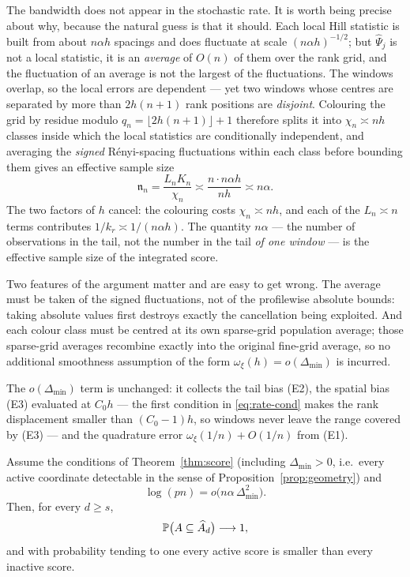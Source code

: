 The bandwidth does not appear in the stochastic rate. It is worth being
precise about why, because the natural guess is that it should. Each
local Hill statistic is built from about $n\alpha h$ spacings and does
fluctuate at scale $(n\alpha h)^{-1/2}$; but $\widehat\Psi_j$ is not a
local statistic, it is an \emph{average} of $O(n)$ of them over the rank
grid, and the fluctuation of an average is not the largest of the
fluctuations. The windows overlap, so the local errors are dependent ---
yet two windows whose centres are separated by more than $2h(n+1)$ rank
positions are \emph{disjoint}. Colouring the grid by residue modulo
$q_n=\lfloor2h(n+1)\rfloor+1$ therefore splits it into $\chi_n\asymp nh$
classes inside which the local statistics are conditionally independent,
and averaging the \emph{signed} R\'enyi-spacing fluctuations within each
class before bounding them gives an effective sample size
\[
 \mathfrak n_n=\frac{L_nK_n}{\chi_n}
 \asymp\frac{n\cdot n\alpha h}{nh}
 \asymp n\alpha .
\]
The two factors of $h$ cancel: the colouring costs $\chi_n\asymp nh$,
and each of the $L_n\asymp n$ terms contributes $1/k_r\asymp1/(n\alpha h)$.
The quantity $n\alpha$ --- the number of observations in the tail, not
the number in the tail \emph{of one window} --- is the effective sample
size of the integrated score.

Two features of the argument matter and are easy to get wrong. The
average must be taken of the signed fluctuations, not of the profilewise
absolute bounds: taking absolute values first destroys exactly the
cancellation being exploited. And each colour class must be centred at
its own sparse-grid population average; those sparse-grid averages
recombine exactly into the original fine-grid average, so no additional
smoothness assumption of the form $\omega_\xi(h)=o(\Delta_{\min})$ is
incurred.

The $o(\Delta_{\min})$ term is unchanged: it collects the tail bias (E2),
the spatial bias (E3) evaluated at $C_0h$ --- the first condition in
\eqref{eq:rate-cond} makes the rank displacement smaller than $(C_0-1)h$,
so windows never leave the range covered by (E3) --- and the quadrature
error $\omega_\xi(1/n)+O(1/n)$ from (E1).

\begin{theorem}\label{thm:sis}
Assume the conditions of Theorem~\ref{thm:score} (including
$\Delta_{\min}>0$, i.e.\ every active coordinate detectable in the
sense of Proposition~\ref{prop:geometry}) and
\begin{equation}\label{eq:sis-cond}
 \log(pn)=o\bigl(n\alpha\,\Delta_{\min}^2\bigr).
\end{equation}
Then, for every $d\ge s$,
\[
 \mathbb P\bigl(A\subseteq\widehat{A}_d\bigr)\longrightarrow1,
\]
and with probability tending to one every active score is smaller than
every inactive score.
\end{theorem}


